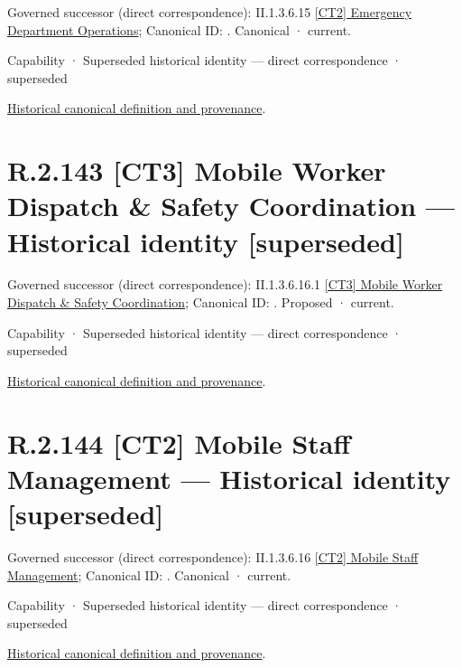 {\small Governed successor (direct correspondence): II.1.3.6.15 \hyperref[element:24a4b5815faa4d369bc756a6e97d3e9e]{[CT2] Emergency Department Operations}; Canonical ID: \texttt{}. Canonical · current.}\par
\label{element:8963b571e9cc40e49c5d738e31d2f97e}
{\small Capability · Superseded historical identity — direct correspondence · superseded}\par
\href{../../../../continuum/strategy/capability/8963b571e9cc40e49c5d738e31d2f97e.md}{Historical canonical definition and provenance}.\par
\section*{R.2.143 [CT3] Mobile Worker Dispatch \& Safety Coordination — Historical identity [superseded]}
\label{navigation:R.2.143}

{\small Governed successor (direct correspondence): II.1.3.6.16.1 \hyperref[element:d72164668dfe448bbebe74e9e1a75233]{[CT3] Mobile Worker Dispatch \& Safety Coordination}; Canonical ID: \texttt{}. Proposed · current.}\par
\label{element:5aafd1f4bff046b2b532c20dfb191473}
{\small Capability · Superseded historical identity — direct correspondence · superseded}\par
\href{../../../../continuum/strategy/capability/5aafd1f4bff046b2b532c20dfb191473.md}{Historical canonical definition and provenance}.\par
\section*{R.2.144 [CT2] Mobile Staff Management — Historical identity [superseded]}
\label{navigation:R.2.144}

{\small Governed successor (direct correspondence): II.1.3.6.16 \hyperref[element:79a4a48fddf74c69acf7e16404d06ea5]{[CT2] Mobile Staff Management}; Canonical ID: \texttt{}. Canonical · current.}\par
\label{element:32118856636f400a95fc28daacea61c8}
{\small Capability · Superseded historical identity — direct correspondence · superseded}\par
\href{../../../../continuum/strategy/capability/32118856636f400a95fc28daacea61c8.md}{Historical canonical definition and provenance}.\par

